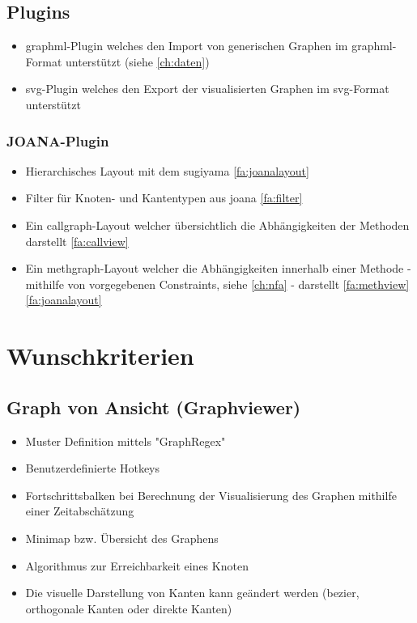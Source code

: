 \subsection{Plugins}
  \begin{itemize}
    \item \gls{graphml}-Plugin welches den Import von generischen Graphen im \gls{graphml}-Format unterstützt (siehe \ref{ch:daten})
    \item \gls{svg}-Plugin welches den Export der visualisierten Graphen im \gls{svg}-Format unterstützt
  \end{itemize}
  
  \subsubsection{JOANA-Plugin}
    \begin{itemize}
      \item Hierarchisches Layout mit dem \gls{sugiyama} \ref{fa:joanalayout}
      \item Filter für Knoten- und Kantentypen aus \gls{joana} \ref{fa:filter}
      \item Ein \gls{callgraph}-Layout welcher übersichtlich die Abhängigkeiten der Methoden darstellt \ref{fa:callview}
      \item Ein \gls{methgraph}-Layout welcher die Abhängigkeiten innerhalb einer Methode - mithilfe von vorgegebenen Constraints, siehe \ref{ch:nfa} - darstellt \ref{fa:methview} \ref{fa:joanalayout}
    \end{itemize}
  

\section{Wunschkriterien}

\subsection{Graph von Ansicht (Graphviewer)}
  \begin{itemize}
    \item Muster Definition mittels "GraphRegex"
    \item Benutzerdefinierte Hotkeys
    \item Fortschrittsbalken bei Berechnung der Visualisierung des Graphen mithilfe einer Zeitabschätzung
    \item Minimap bzw. Übersicht des Graphens
    \item Algorithmus zur Erreichbarkeit eines Knoten
    \item Die visuelle Darstellung von Kanten kann geändert werden (\gls{bezier}, orthogonale Kanten oder direkte Kanten)
  \end{itemize}

